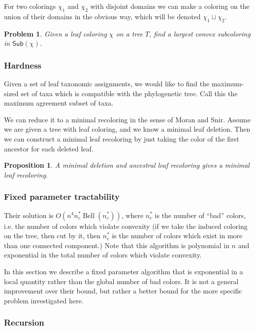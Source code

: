 \documentclass{amsart}
\newcommand{\col}{\chi}
\newcommand{\subcolS}{\mathsf{Sub}}
\newcommand{\Bell}{\operatorname{Bell}}
\newcommand{\nbadcolors}{n_c^*}
\newtheorem{prop}{Proposition}
\newtheorem{problem}{Problem}
\begin{document}
For two colorings $\col_1$ and $\col_2$ with disjoint domains we can make a coloring on the union of their domains in the obvious way, which will be denoted $\col_1 \sqcup \col_2$.

\begin{problem}
\label{prob:subcolor}
  Given a leaf coloring $\col$ on a tree $T$, find a largest convex subcoloring in $\subcolS(\col)$.
\end{problem}

\subsubsection{Hardness}
Given a set of leaf taxonomic assignments, we would like to find the maximum-sized set of taxa which is compatible with the phylogenetic tree.
Call this the maximum agreement subset of taxa.

We can reduce it to a minimal recoloring in the sense of Moran and Snir.
Assume we are given a tree with leaf coloring, and we know a minimal leaf deletion.
Then we can construct a minimal leaf recoloring by just taking the color of the first ancestor for each deleted leaf.

\begin{prop}
  A minimal deletion and ancestral leaf recoloring gives a minimal leaf recoloring.
\end{prop}

\subsubsection{Fixed parameter tractability}
Their solution is $O(n^4 \nbadcolors \Bell(\nbadcolors))$, where $\nbadcolors$ is the number of ``bad'' colors, i.e. the number of colors which violate convexity (if we take the induced coloring on the tree, then cut by it, then $\nbadcolors$ is the number of colors which exist in more than one connected component.)
Note that this algorithm is polynomial in $n$ and exponential in the total number of colors which violate convexity.

In this section we describe a fixed parameter algorithm that is exponential in a local quantity rather than the global number of bad colors.
It is not a general improvement over their bound, but rather a better bound for the more specific problem investigated here.


\subsubsection{Recursion}
\end{document}
